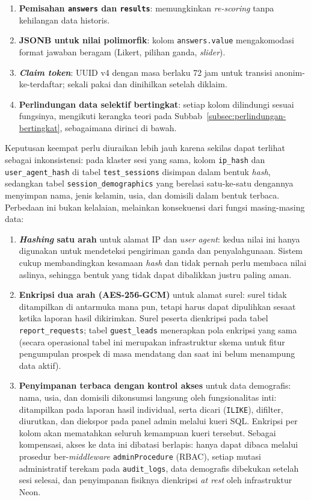 \begin{enumerate}[leftmargin=2cm]
  \item \textbf{Pemisahan \texttt{answers} dan \texttt{results}}: memungkinkan \textit{re-scoring} tanpa kehilangan data historis.
  \item \textbf{JSONB untuk nilai polimorfik}: kolom \texttt{answers.value} mengakomodasi format jawaban beragam (Likert, pilihan ganda, \textit{slider}).
  \item \textbf{\textit{Claim token}}: UUID v4 dengan masa berlaku 72 jam untuk transisi anonim-ke-terdaftar; sekali pakai dan dinihilkan setelah diklaim.
  \item \textbf{Perlindungan data selektif bertingkat}: setiap kolom dilindungi sesuai fungsinya, mengikuti kerangka teori pada Subbab~\ref{subsec:perlindungan-bertingkat}, sebagaimana dirinci di bawah.
\end{enumerate}

Keputusan keempat perlu diuraikan lebih jauh karena sekilas dapat terlihat sebagai inkonsistensi: pada klaster sesi yang sama, kolom \texttt{ip\_hash} dan \texttt{user\_agent\_hash} di tabel \texttt{test\_sessions} disimpan dalam bentuk \textit{hash}, sedangkan tabel \texttt{session\_demographics} yang berelasi satu-ke-satu dengannya menyimpan nama, jenis kelamin, usia, dan domisili dalam bentuk terbaca. Perbedaan ini bukan kelalaian, melainkan konsekuensi dari fungsi masing-masing data:

\begin{enumerate}[leftmargin=2cm]
  \item \textbf{\textit{Hashing} satu arah} untuk alamat IP dan \textit{user agent}: kedua nilai ini hanya digunakan untuk mendeteksi pengiriman ganda dan penyalahgunaan. Sistem cukup membandingkan kesamaan \textit{hash} dan tidak pernah perlu membaca nilai aslinya, sehingga bentuk yang tidak dapat dibalikkan justru paling aman.
  \item \textbf{Enkripsi dua arah (AES-256-GCM)} untuk alamat surel: surel tidak ditampilkan di antarmuka mana pun, tetapi harus dapat dipulihkan sesaat ketika laporan hasil dikirimkan. Surel peserta dienkripsi pada tabel \texttt{report\_requests}; tabel \texttt{guest\_leads} menerapkan pola enkripsi yang sama (secara operasional tabel ini merupakan infrastruktur skema untuk fitur pengumpulan prospek di masa mendatang dan saat ini belum menampung data aktif).
  \item \textbf{Penyimpanan terbaca dengan kontrol akses} untuk data demografis: nama, usia, dan domisili dikonsumsi langsung oleh fungsionalitas inti: ditampilkan pada laporan hasil individual, serta dicari (\texttt{ILIKE}), difilter, diurutkan, dan diekspor pada panel admin melalui kueri SQL. Enkripsi per kolom akan mematahkan seluruh kemampuan kueri tersebut. Sebagai kompensasi, akses ke data ini dibatasi berlapis: hanya dapat dibaca melalui prosedur ber-\textit{middleware} \texttt{adminProcedure} (RBAC), setiap mutasi administratif terekam pada \texttt{audit\_logs}, data demografis dibekukan setelah sesi selesai, dan penyimpanan fisiknya dienkripsi \textit{at rest} oleh infrastruktur Neon.
\end{enumerate}

